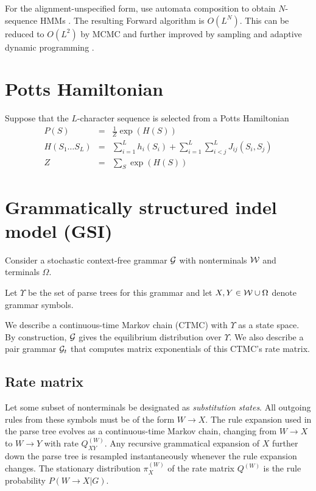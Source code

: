 \documentclass{article}
\begin{document}
For the alignment-unspecified form, use automata composition to obtain $N$-sequence HMMs \cite{SilvestreRyanEtAl2020}.
The resulting Forward algorithm is $O(L^N)$.
This can be reduced to $O(L^2)$ by MCMC \cite{RedelingsSuchard2007}
and further improved by sampling \cite{WestessonEtAl2012}
and adaptive dynamic programming \cite{DeMaio2020}.

\section{Potts Hamiltonian}

Suppose that the $L$-character sequence
is selected from a Potts Hamiltonian
\begin{eqnarray*}
P(S) & = & \frac{1}{Z} \exp(H(S)) \\
H(S_1 \ldots S_L) & = &
\sum_{i=1}^L h_i(S_i)
+
\sum_{i=1}^L \sum_{i<j}^L J_{ij}(S_i,S_j)
\\
Z & = & \sum_S \exp(H(S))
\end{eqnarray*}


\section{Grammatically structured indel model (GSI)}

Consider a stochastic context-free grammar ${\cal G}$
with nonterminals ${\cal W}$ and terminals $\Omega$.

Let $\Upsilon$ be the set of parse trees for this grammar
and let $X,Y \in {\cal W}\cup\Omega$ denote grammar symbols.

We describe a continuous-time Markov chain (CTMC) with $\Upsilon$ as a state space.
By construction, ${\cal G}$ gives the equilibrium distribution over $\Upsilon$.
We also describe a pair grammar ${\cal G}_t$ that computes matrix exponentials of this CTMC's rate matrix.

\subsection{Rate matrix}

Let some subset of nonterminals be designated as {\em substitution states}.
All outgoing rules from these symbols must be of the form $W \to X$.
The rule expansion used in the parse tree evolves as a continuous-time Markov chain,
changing from $W \to X$ to $W \to Y$ with rate $Q^{(W)}_{XY}$.
Any recursive grammatical expansion of $X$ further down the parse tree
is resampled instantaneously whenever the rule expansion changes.
The stationary distribution $\pi^{(W)}_X$ of the rate matrix $Q^{(W)}$ is the rule probability $P(W \to X|G)$.
\end{document}
